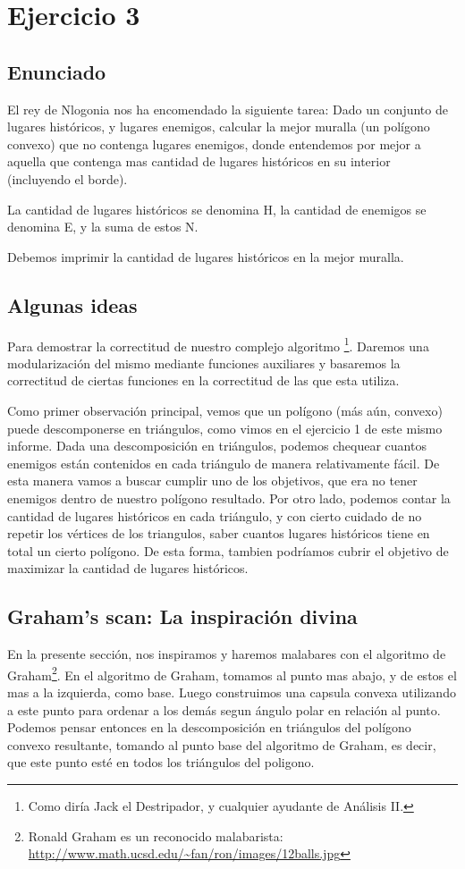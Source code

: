 \section{Ejercicio 3}

\subsection{Enunciado}

El rey de Nlogonia nos ha encomendado la siguiente tarea: Dado un conjunto de lugares históricos, y lugares enemigos, calcular la mejor muralla (un polígono convexo) que no contenga lugares enemigos, donde entendemos por mejor a aquella que contenga mas cantidad de lugares históricos en su interior (incluyendo el borde).

La cantidad de lugares históricos se denomina H, la cantidad de enemigos se denomina E, y la suma de estos N.

Debemos imprimir la cantidad de lugares históricos en la mejor muralla.

\subsection{Algunas ideas}
\par{Para demostrar la correctitud de nuestro complejo algoritmo \footnote{Como diría Jack el Destripador, y cualquier ayudante de Análisis II.}. Daremos una modularización del mismo mediante funciones auxiliares y basaremos la correctitud de ciertas funciones en la correctitud de las que esta utiliza.} 
\par{Como primer observación principal, vemos que un polígono (más aún, convexo) puede descomponerse en triángulos, como vimos en el ejercicio 1 de este mismo informe. Dada una descomposición en triángulos, podemos chequear cuantos enemigos están contenidos en cada triángulo de manera relativamente fácil. De esta manera vamos a buscar cumplir uno de los objetivos, que era no tener enemigos dentro de nuestro polígono resultado. Por otro lado, podemos contar la cantidad de lugares históricos en cada triángulo, y con cierto cuidado de no repetir los vértices de los triangulos, saber cuantos lugares históricos tiene en total un cierto polígono. De esta forma, tambien podríamos cubrir el objetivo de maximizar la cantidad de lugares históricos.}

\subsection{Graham's scan: La inspiración divina}
\par{En la presente sección, nos inspiramos y haremos malabares con el algoritmo de Graham\footnote{Ronald Graham es un reconocido malabarista: \url{http://www.math.ucsd.edu/~fan/ron/images/12balls.jpg}}.
En el algoritmo de Graham, tomamos al punto mas abajo, y de estos el mas a la izquierda, como base. Luego construimos una capsula convexa utilizando a este punto para ordenar a los demás segun ángulo polar en relación al punto. Podemos pensar entonces en la descomposición en triángulos del polígono convexo resultante, tomando al punto base del algoritmo de Graham, es decir, que este punto esté en todos los triángulos del poligono.}

